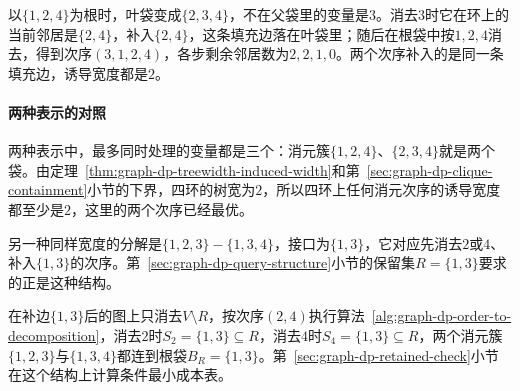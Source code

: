 以$\{1,2,4\}$为根时，叶袋变成$\{2,3,4\}$，不在父袋里的变量是$3$。消去$3$时它在环上的当前邻居是$\{2,4\}$，补入$\{2,4\}$，这条填充边落在叶袋里；随后在根袋中按$1,2,4$消去，得到次序$(3,1,2,4)$，各步剩余邻居数为$2,2,1,0$。两个次序补入的是同一条填充边，诱导宽度都是$2$。

\paragraph{两种表示的对照}
两种表示中，最多同时处理的变量都是三个：消元簇$\{1,2,4\}$、$\{2,3,4\}$就是两个袋。由定理~\ref{thm:graph-dp-treewidth-induced-width}和第~\ref{sec:graph-dp-clique-containment}小节的下界，四环的树宽为$2$，所以四环上任何消元次序的诱导宽度都至少是$2$，这里的两个次序已经最优。

另一种同样宽度的分解是$\{1,2,3\}-\{1,3,4\}$，接口为$\{1,3\}$，它对应先消去$2$或$4$、补入$\{1,3\}$的次序。第~\ref{sec:graph-dp-query-structure}小节的保留集$R=\{1,3\}$要求的正是这种结构。

在补边$\{1,3\}$后的图上只消去$V\setminus R$，按次序$(2,4)$执行算法~\ref{alg:graph-dp-order-to-decomposition}，消去$2$时$S_2=\{1,3\}\subseteq R$，消去$4$时$S_4=\{1,3\}\subseteq R$，两个消元簇$\{1,2,3\}$与$\{1,3,4\}$都连到根袋$B_R=\{1,3\}$。第~\ref{sec:graph-dp-retained-check}小节在这个结构上计算条件最小成本表。
